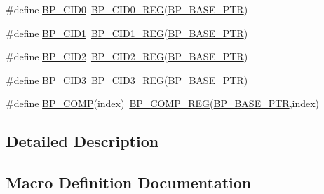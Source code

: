 \begin{DoxyCompactItemize}
\item 
\#define \hyperlink{group___b_p___register___accessor___macros_gac554c0442a617d13f84c95af8faf9a11}{B\+P\+\_\+\+C\+I\+D0}~\hyperlink{group___b_p___register___accessor___macros_ga1216ef67c24c041666917bdc6bec2c3b}{B\+P\+\_\+\+C\+I\+D0\+\_\+\+R\+EG}(\hyperlink{group___b_p___peripheral_ga375cd6d2e7ec414f4e33cb54d5494940}{B\+P\+\_\+\+B\+A\+S\+E\+\_\+\+P\+TR})
\item 
\#define \hyperlink{group___b_p___register___accessor___macros_ga25e9b4026009629d703d5463baa85695}{B\+P\+\_\+\+C\+I\+D1}~\hyperlink{group___b_p___register___accessor___macros_gafaa36c48b9ff78d894974b7b93afbe10}{B\+P\+\_\+\+C\+I\+D1\+\_\+\+R\+EG}(\hyperlink{group___b_p___peripheral_ga375cd6d2e7ec414f4e33cb54d5494940}{B\+P\+\_\+\+B\+A\+S\+E\+\_\+\+P\+TR})
\item 
\#define \hyperlink{group___b_p___register___accessor___macros_gabe4f49fd630b67a0ba0e58b37fb78c58}{B\+P\+\_\+\+C\+I\+D2}~\hyperlink{group___b_p___register___accessor___macros_ga59035270d4574277d55a5aef7fa350db}{B\+P\+\_\+\+C\+I\+D2\+\_\+\+R\+EG}(\hyperlink{group___b_p___peripheral_ga375cd6d2e7ec414f4e33cb54d5494940}{B\+P\+\_\+\+B\+A\+S\+E\+\_\+\+P\+TR})
\item 
\#define \hyperlink{group___b_p___register___accessor___macros_gaa9964a6a353ac63f76306563fda7b188}{B\+P\+\_\+\+C\+I\+D3}~\hyperlink{group___b_p___register___accessor___macros_ga7801e128c54f36d727767e20b4729c21}{B\+P\+\_\+\+C\+I\+D3\+\_\+\+R\+EG}(\hyperlink{group___b_p___peripheral_ga375cd6d2e7ec414f4e33cb54d5494940}{B\+P\+\_\+\+B\+A\+S\+E\+\_\+\+P\+TR})
\item 
\#define \hyperlink{group___b_p___register___accessor___macros_gafc2b6b687efce75bcd85d343d0d74fbd}{B\+P\+\_\+\+C\+O\+MP}(index)~\hyperlink{group___b_p___register___accessor___macros_gaa003734bc6b716d1723b103a68d560ba}{B\+P\+\_\+\+C\+O\+M\+P\+\_\+\+R\+EG}(\hyperlink{group___b_p___peripheral_ga375cd6d2e7ec414f4e33cb54d5494940}{B\+P\+\_\+\+B\+A\+S\+E\+\_\+\+P\+TR},index)
\end{DoxyCompactItemize}


\subsection{Detailed Description}


\subsection{Macro Definition Documentation}
\mbox{\label{group___b_p___register___accessor___macros_gac554c0442a617d13f84c95af8faf9a11}} 
